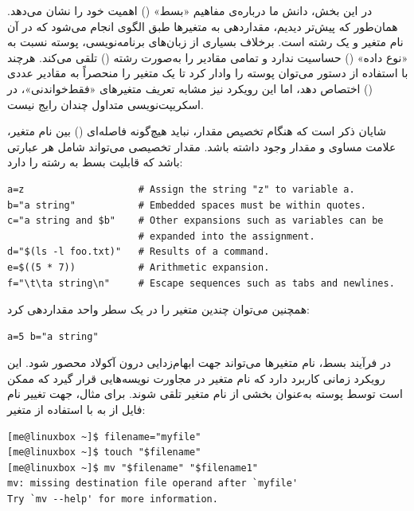 در این بخش، دانش ما درباره‌ی مفاهیم «بسط» () اهمیت خود را نشان می‌دهد. همان‌طور که پیش‌تر دیدیم، مقداردهی به متغیرها طبق الگوی  انجام می‌شود که در آن  نام متغیر و  یک رشته است. برخلاف بسیاری از زبان‌های برنامه‌نویسی، پوسته نسبت به «نوع داده» () حساسیت ندارد و تمامی مقادیر را به‌صورت رشته () تلقی می‌کند. هرچند با استفاده از دستور  می‌توان پوسته را وادار کرد تا یک متغیر را منحصراً به مقادیر عددی () اختصاص دهد، اما این رویکرد نیز مشابه تعریف متغیرهای «فقط‌خواندنی»، در اسکریپت‌نویسی متداول چندان رایج نیست.

شایان ذکر است که هنگام تخصیص مقدار، نباید هیچ‌گونه فاصله‌ای () بین نام متغیر، علامت مساوی و مقدار وجود داشته باشد. مقدار تخصیصی می‌تواند شامل هر عبارتی باشد که قابلیت بسط به رشته را دارد:

\begin{latin}
\begin{lstlisting}
a=z                    # Assign the string "z" to variable a.
b="a string"           # Embedded spaces must be within quotes.
c="a string and $b"    # Other expansions such as variables can be
                       # expanded into the assignment.
d="$(ls -l foo.txt)"   # Results of a command.
e=$((5 * 7))           # Arithmetic expansion.
f="\t\ta string\n"     # Escape sequences such as tabs and newlines.
\end{lstlisting}
\end{latin}

همچنین می‌توان چندین متغیر را در یک سطر واحد مقداردهی کرد:

\begin{latin}
\begin{lstlisting}
a=5 b="a string"
\end{lstlisting}
\end{latin}

در فرآیند بسط، نام متغیرها می‌تواند جهت ابهام‌زدایی درون آکولاد \cmd{\{\}} محصور شود. این رویکرد زمانی کاربرد دارد که نام متغیر در مجاورت نویسه‌هایی قرار گیرد که ممکن است توسط پوسته به‌عنوان بخشی از نام متغیر تلقی شوند. برای مثال، جهت تغییر نام فایل از  به  با استفاده از متغیر:

\begin{latin}
\begin{lstlisting}
[me@linuxbox ~]$ filename="myfile"
[me@linuxbox ~]$ touch "$filename"
[me@linuxbox ~]$ mv "$filename" "$filename1"
mv: missing destination file operand after `myfile'
Try `mv --help' for more information.
\end{lstlisting}
\end{latin}

